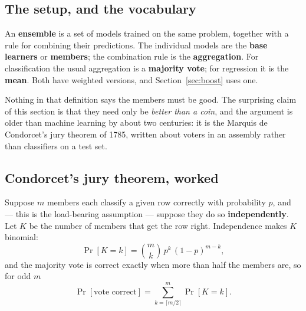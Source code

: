 \documentclass[11pt]{article}
\begin{document}
\subsection{The setup, and the vocabulary}

An \textbf{ensemble} is a set of models trained on the same problem, together
with a rule for combining their predictions. The individual models are the
\textbf{base learners} or \textbf{members}; the combination rule is the
\textbf{aggregation}. For classification the usual aggregation is a
\textbf{majority vote}; for regression it is the \textbf{mean}. Both have
weighted versions, and Section~\ref{sec:boost} uses one.

Nothing in that definition says the members must be good. The surprising claim
of this section is that they need only be \emph{better than a coin}, and the
argument is older than machine learning by about two centuries: it is the
Marquis de Condorcet's jury theorem of 1785, written about voters in an
assembly rather than classifiers on a test set.

\subsection{Condorcet's jury theorem, worked}

Suppose $m$ members each classify a given row correctly with probability $p$,
and --- this is the load-bearing assumption --- suppose they do so
\textbf{independently}. Let $K$ be the number of members that get the row
right. Independence makes $K$ binomial:
\begin{equation}
  \Pr[K = k] = \binom{m}{k}\,p^{k}\,(1-p)^{m-k},
  \label{eq:binom}
\end{equation}
and the majority vote is correct exactly when more than half the members are,
so for odd $m$
\begin{equation}
  \Pr[\text{vote correct}] = \sum_{k = \lceil m/2 \rceil}^{m} \Pr[K = k].
  \label{eq:majority}
\end{equation}
\end{document}

